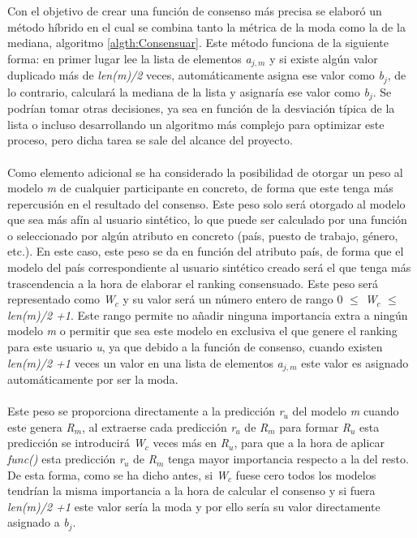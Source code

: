 Con el objetivo de crear una función de consenso más precisa se elaboró un método híbrido en el cual se combina tanto la métrica de la moda como la de la mediana, algoritmo \ref{algth:Consensuar}. Este método funciona de la siguiente forma: en primer lugar lee la lista de elementos \textit{a$_{j, m}$} y si existe algún valor duplicado más de \textit{len(m)/2} veces, automáticamente asigna ese valor como \textit{b$_{j}$}, de lo contrario, calculará la mediana de la lista y asignaría ese valor como \textit{b$_{j}$}. Se podrían tomar otras decisiones, ya sea en función de la desviación típica de la lista o incluso desarrollando un algoritmo más complejo para optimizar este proceso, pero dicha tarea se sale del alcance del proyecto.
\\ \\
Como elemento adicional se ha considerado la posibilidad de otorgar un peso al modelo \textit{m} de cualquier participante en concreto, de forma que este tenga más repercusión en el resultado del consenso. Este peso solo será otorgado al modelo que sea más afín al usuario sintético, lo que puede ser calculado por una función o seleccionado por algún atributo en concreto (país, puesto de trabajo, género, etc.). En este caso, este peso se da en función del atributo país, de forma que el modelo del país correspondiente al usuario sintético creado será el que tenga más trascendencia a la hora de elaborar el ranking consensuado. Este peso será representado como \textit{W$_{c}$} y su valor será un número entero de rango 0 $\leq$ \textit{W$_{c}$} $\leq$ \textit{len(m)/2 +1}. Este rango permite no añadir ninguna importancia extra a ningún modelo \textit{m} o permitir que sea este modelo en exclusiva el que genere el ranking para este usuario \textit{u}, ya que debido a la función de consenso, cuando existen \textit{len(m)/2 +1} veces un valor en una lista de elementos \textit{a$_{j, m}$} este valor es asignado automáticamente por ser la moda.
\\ \\
Este peso se proporciona directamente a la predicción \textit{r$_{u}$} del modelo \textit{m} cuando este genera \textit{R$_{m}$}, al extraerse cada predicción \textit{r$_{u}$} de \textit{R$_{m}$} para formar \textit{R$_{u}$} esta predicción se introducirá \textit{W$_{c}$} veces más en \textit{R$_{u}$}, para que a la hora de aplicar \textit{func()} esta predicción \textit{r$_{u}$} de \textit{R$_{m}$} tenga mayor importancia respecto a la del resto. De esta forma, como se ha dicho antes, si \textit{W$_{c}$} fuese cero todos los modelos tendrían la misma importancia a la hora de calcular el consenso y si fuera \textit{len(m)/2 +1} este valor sería la moda y por ello sería su valor directamente asignado a \textit{b$_{j}$}.

